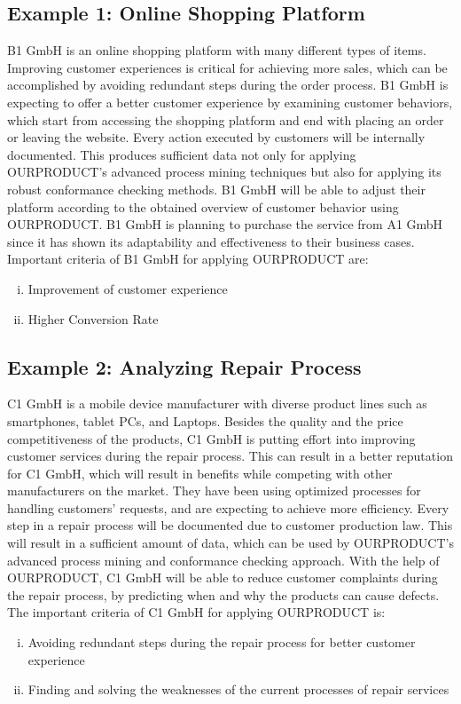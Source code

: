 \documentclass{article}
\begin{document}
\subsection{Example 1: Online Shopping Platform}
B1 GmbH is an online shopping platform with many different types of items. Improving customer experiences is critical for achieving more sales, which can be accomplished by avoiding redundant steps during the order process. B1 GmbH is expecting to offer a better customer experience by examining customer behaviors, which start from accessing the shopping platform and end with placing an order or leaving the website. Every action executed by customers will be internally documented. This produces sufficient data not only for applying OURPRODUCT’s advanced process mining techniques but also for applying its robust conformance checking methods. B1 GmbH will be able to adjust their platform according to the obtained overview of customer behavior using OURPRODUCT. B1 GmbH is planning to purchase the service from A1 GmbH since it has shown its adaptability and effectiveness to their business cases. Important criteria of B1 GmbH for applying OURPRODUCT are:
\begin{enumerate}[i.]
\item Improvement of customer experience
\item Higher Conversion Rate
\end{enumerate}

\subsection{Example 2: Analyzing Repair Process}
C1 GmbH is a mobile device manufacturer with diverse product lines such as smartphones, tablet PCs, and Laptops. Besides the quality and the price competitiveness of the products, C1 GmbH is putting effort into improving customer services during the repair process.  This can result in a better reputation for C1 GmbH, which will result in benefits while competing with other manufacturers on the market. They have been using optimized processes for handling customers' requests, and are expecting to achieve more efficiency.  Every step in a repair process will be documented due to customer production law. This will result in a sufficient amount of data, which can be used by OURPRODUCT’s advanced process mining and conformance checking approach. With the help of OURPRODUCT, C1 GmbH will be able to reduce customer complaints during the repair process, by predicting when and why the products can cause defects. The important criteria of C1 GmbH for applying OURPRODUCT is:
\begin{enumerate}[i.]
\item Avoiding redundant steps during the repair process for better customer experience
\item Finding and solving the weaknesses of the current processes of repair services
\end{enumerate}
\end{document}
